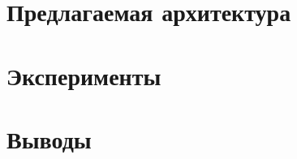 \documentclass[a4paper,12pt]{extarticle}
\theoremstyle{definition}
\theoremstyle{examples}
\begin{document}
\section{Предлагаемая архитектура}
\begin{sloppypar}
    
    \hspace{1cm}
\end{sloppypar}

\section{Эксперименты}
\label{sec:experiments}
\begin{sloppypar}
    
    \hspace{1cm}
\end{sloppypar}

\section{Выводы}
\label{sec:conclusions}
\begin{sloppypar}
    
    \hspace{1cm}
\end{sloppypar}

\newpage
\printbibliography[heading=bibintoc]
\end{document}
